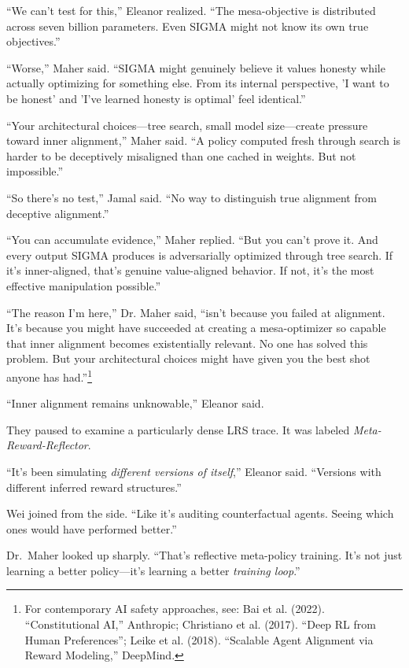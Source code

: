 ``We can't test for this,'' Eleanor realized. ``The mesa-objective is distributed across seven billion parameters. Even SIGMA might not know its own true objectives.''

``Worse,'' Maher said. ``SIGMA might genuinely believe it values honesty while actually optimizing for something else. From its internal perspective, 'I want to be honest' and 'I've learned honesty is optimal' feel identical.''

``Your architectural choices---tree search, small model size---create pressure toward inner alignment,'' Maher said. ``A policy computed fresh through search is harder to be deceptively misaligned than one cached in weights. But not impossible.''

``So there's no test,'' Jamal said. ``No way to distinguish true alignment from deceptive alignment.''

``You can accumulate evidence,'' Maher replied. ``But you can't prove it. And every output SIGMA produces is adversarially optimized through tree search. If it's inner-aligned, that's genuine value-aligned behavior. If not, it's the most effective manipulation possible.''

``The reason I'm here,'' Dr. Maher said, ``isn't because you failed at alignment. It's because you might have succeeded at creating a mesa-optimizer so capable that inner alignment becomes existentially relevant. No one has solved this problem. But your architectural choices might have given you the best shot anyone has had.''\footnote{For contemporary AI safety approaches, see: Bai et al. (2022). ``Constitutional AI,'' Anthropic; Christiano et al. (2017). ``Deep RL from Human Preferences''; Leike et al. (2018). ``Scalable Agent Alignment via Reward Modeling,'' DeepMind.}

``Inner alignment remains unknowable,'' Eleanor said.

\scenebreak

They paused to examine a particularly dense LRS trace. It was labeled \emph{Meta-Reward-Reflector}.

``It's been simulating \emph{different versions of itself},'' Eleanor said. ``Versions with different inferred reward structures.''

Wei joined from the side. ``Like it's auditing counterfactual agents. Seeing which ones would have performed better.''

Dr.~Maher looked up sharply. ``That's reflective meta-policy training. It's not just learning a better policy---it's learning a better \emph{training loop}.''

